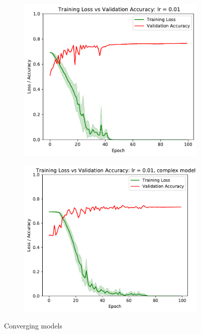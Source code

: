 \documentclass[sigconf,nonacm]{acmart}
\begin{document}
\begin{figure}[ht]
\begin{subfigure}[c]{0.45\columnwidth}
\includegraphics[width=\textwidth]{plot_0.01.pdf}
\end{subfigure}
\begin{subfigure}[c]{0.45\columnwidth}
\includegraphics[width=\textwidth]{plot_complex_0.01.pdf}
\end{subfigure}
\caption{Converging models}
\label{part2:converging}
\end{figure}
\end{document}
